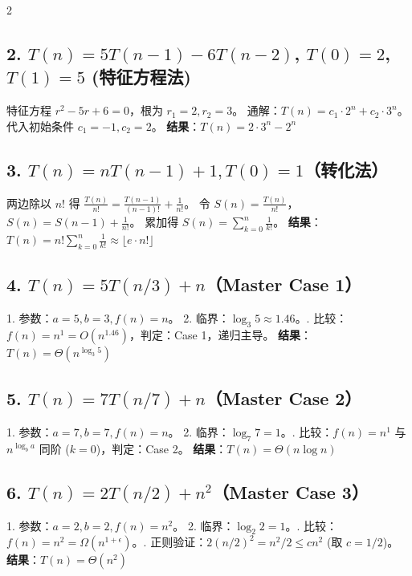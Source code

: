 \documentclass[10pt, a4paper]{article}
\begin{document}
\begin{multicols*}{2}
\subsection{2. $T(n)=5T(n-1)-6T(n-2)$, $T(0)=2$, $T(1)=5$ (特征方程法)}

特征方程 $r^2 - 5r + 6 = 0$，根为 $r_1=2, r_2=3$。\newline
通解：$T(n) = c_1 \cdot 2^n + c_2 \cdot 3^n$。
代入初始条件 $c_1 = -1, c_2 = 2$。\newline
\textbf{结果}：$T(n) = 2 \cdot 3^n - 2^n$

\vspace{12pt}
\subsection{3. $T(n)=nT(n-1)+1, T(0)=1$（转化法）}
两边除以 $n!$ 得 $\frac{T(n)}{n!} = \frac{T(n-1)}{(n-1)!} + \frac{1}{n!}$。\newline
令 $S(n) = \frac{T(n)}{n!}$，$S(n) = S(n-1) + \frac{1}{n!}$。
累加得 $S(n) = \sum_{k=0}^n \frac{1}{k!}$。\newline
\textbf{结果}：$T(n) = n! \sum_{k=0}^n \frac{1}{k!} \approx \lfloor e \cdot n! \rfloor$

\vspace{12pt}
\subsection{4. $T(n)=5T(n/3)+n$（Master Case 1）}
1. 参数：$a=5, b=3, f(n)=n$。
2. 临界：$\log_3 5 \approx 1.46$。. 比较：$f(n) = n^1 = O(n^{1.46})$，判定：Case 1，递归主导。\newline
\textbf{结果}：$T(n) = \Theta(n^{\log_3 5})$

\vspace{12pt}
\subsection{5. $T(n)=7T(n/7)+n$（Master Case 2）}
1. 参数：$a=7, b=7, f(n)=n$。
2. 临界：$\log_7 7 = 1$。. 比较：$f(n) = n^1$ 与 $n^{\log_b a}$ 同阶 ($k=0$)，判定：Case 2。\newline
\textbf{结果}：$T(n) = \Theta(n \log n)$

\vspace{12pt}
\subsection{6. $T(n) = 2T(n/2) + n^2$（Master Case 3）}
1. 参数：$a=2, b=2, f(n)=n^2$。
2. 临界：$\log_2 2 = 1$。. 比较：$f(n) = n^2 = \Omega(n^{1+\epsilon})$。. 正则验证：$2(n/2)^2 = n^2/2 \le c n^2$ (取 $c=1/2$)。\newline
\textbf{结果}：$T(n) = \Theta(n^2)$


\end{multicols*}
\end{document}
